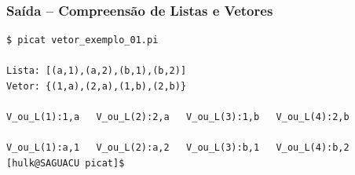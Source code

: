  \begin{frame}[fragile]
 \frametitle{Saída -- Compreensão de Listas e Vetores}
\begin{footnotesize}
\begin{verbatim}
$ picat vetor_exemplo_01.pi 

Lista: [(a,1),(a,2),(b,1),(b,2)]  
Vetor: {(1,a),(2,a),(1,b),(2,b)}

V_ou_L(1):1,a 	V_ou_L(2):2,a 	V_ou_L(3):1,b 	V_ou_L(4):2,b 	

V_ou_L(1):a,1 	V_ou_L(2):a,2 	V_ou_L(3):b,1 	V_ou_L(4):b,2 	
[hulk@SAGUACU picat]$ 
\end{verbatim}
\end{footnotesize}
 
\end{frame}

